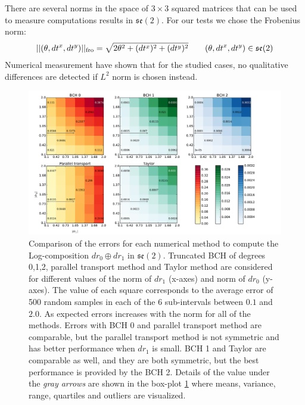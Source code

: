 There are several norms in the space of $3\times 3$ squared matrices that can be used to measure computations results in $\mathfrak{se}(2)$. For our tests we chose the Frobenius norm:
\begin{align*}
\vert\lvert (\theta,dt^{x},dt^{y}) \rvert\vert_{\text{fro}} = \sqrt{2\theta^{2} + (dt^{x})^2 + (dt^{y})^2} 
\qquad
(\theta,dt^{x},dt^{y}) \in \mathfrak{se}(2)
\end{align*}
Numerical measurement have shown that for the studied cases, no qualitative differences are detected if $L^{2}$ norm is chosen instead.
 \begin{figure}[!ht]
 	\hspace{-1.3cm}
 	\includegraphics[scale=0.50]{figures/se2_image_scale.pdf}
 	\caption{Comparison of the errors for each numerical method to compute the Log-composition $dr_{0} \oplus dr_{1}$ in $\mathfrak{se}(2)$. Truncated BCH of degrees 0,1,2, parallel transport method and Taylor method are considered for different values of the norm of $dr_{1}$ (x-axes) and norm of $dr_{0}$ (y-axes). 
 	The value of each square corresponds to the average error of 500 random samples in each of the 6 sub-intervals between $0.1$ and $2.0$. 
 	As expected errors increases with the norm for all of the methods.
 	Errors with BCH 0 and parallel transport method are comparable, but the parallel transport method is not symmetric and has better performance when $dr_{1}$ is small. BCH 1 and Taylor are comparable as well, and they are both symmetric, but the best performance is provided by the BCH 2. Details of the value under the \emph{gray arrows} are shown in the box-plot \ref{fig:se2_image_scale} where means, variance, range, quartiles and outliers are visualized.
 	 }
 	\label{fig:se2_image_scale}
 \end{figure}

